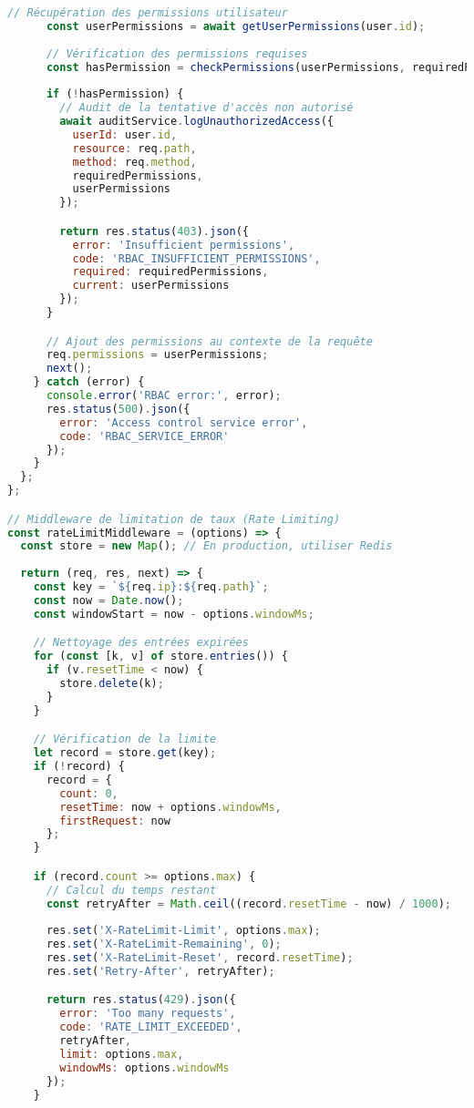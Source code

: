 \documentclass[12pt,a4paper]{report}
\begin{document}
\begin{lstlisting}[language=JavaScript, caption=Middleware de sécurité complet]
      // Récupération des permissions utilisateur
      const userPermissions = await getUserPermissions(user.id);
      
      // Vérification des permissions requises
      const hasPermission = checkPermissions(userPermissions, requiredPermissions);
      
      if (!hasPermission) {
        // Audit de la tentative d'accès non autorisé
        await auditService.logUnauthorizedAccess({
          userId: user.id,
          resource: req.path,
          method: req.method,
          requiredPermissions,
          userPermissions
        });

        return res.status(403).json({
          error: 'Insufficient permissions',
          code: 'RBAC_INSUFFICIENT_PERMISSIONS',
          required: requiredPermissions,
          current: userPermissions
        });
      }

      // Ajout des permissions au contexte de la requête
      req.permissions = userPermissions;
      next();
    } catch (error) {
      console.error('RBAC error:', error);
      res.status(500).json({
        error: 'Access control service error',
        code: 'RBAC_SERVICE_ERROR'
      });
    }
  };
};

// Middleware de limitation de taux (Rate Limiting)
const rateLimitMiddleware = (options) => {
  const store = new Map(); // En production, utiliser Redis
  
  return (req, res, next) => {
    const key = `${req.ip}:${req.path}`;
    const now = Date.now();
    const windowStart = now - options.windowMs;

    // Nettoyage des entrées expirées
    for (const [k, v] of store.entries()) {
      if (v.resetTime < now) {
        store.delete(k);
      }
    }

    // Vérification de la limite
    let record = store.get(key);
    if (!record) {
      record = {
        count: 0,
        resetTime: now + options.windowMs,
        firstRequest: now
      };
    }

    if (record.count >= options.max) {
      // Calcul du temps restant
      const retryAfter = Math.ceil((record.resetTime - now) / 1000);
      
      res.set('X-RateLimit-Limit', options.max);
      res.set('X-RateLimit-Remaining', 0);
      res.set('X-RateLimit-Reset', record.resetTime);
      res.set('Retry-After', retryAfter);

      return res.status(429).json({
        error: 'Too many requests',
        code: 'RATE_LIMIT_EXCEEDED',
        retryAfter,
        limit: options.max,
        windowMs: options.windowMs
      });
    }


\end{lstlisting}
\end{document}
